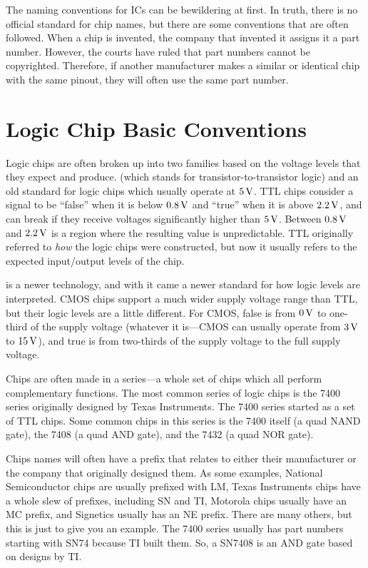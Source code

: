 The naming conventions for ICs can be bewildering at first.
In truth, there is no official standard for chip names, but there are some conventions that are often followed.
When a chip is invented, the company that invented it assigns it a part number.
However, the courts have ruled that part numbers cannot be copyrighted.
Therefore, if another manufacturer makes a similar or identical chip with the same pinout, they will often use the same part number.

\section{Logic Chip Basic Conventions}

Logic chips are often broken up into two families based on the voltage levels that they expect and produce.
 (which stands for transistor-to-transistor logic) and an old standard for logic chips which usually operate at $5\,\si{\volt}$.
TTL chips consider a signal to be ``false'' when it is below $0.8\,\si{\volt}$ and ``true'' when it is above $2.2\,\si{\volt}$, and can break if they receive voltages significantly higher than $5\,\si{\volt}$.
Between $0.8\,\si{\volt}$ and $2.2\,\si{\volt}$ is a region where the resulting value is unpredictable.
TTL originally referred to \emph{how} the logic chips were constructed, but now it usually refers to the expected input/output levels of the chip.

 is a newer technology, and with it came a newer standard for how logic levels are interpreted.  
CMOS chips support a much wider supply voltage range than TTL, but their logic levels are a little different.
For CMOS, false is from $0\,\si{\volt}$ to one-third of the supply voltage (whatever it is---CMOS can usually operate from $3\,\si{\volt}$ to $15\,\si{\volt}$), and true is from two-thirds of the supply voltage to the full supply voltage.

Chips are often made in a series---a whole set of chips which all perform complementary functions.
The most common series of logic chips is the 7400 series originally designed by Texas Instruments.
The 7400 series started as a set of TTL chips.
Some common chips in this series is the 7400 itself (a quad NAND gate), the 7408 (a quad AND gate), and the 7432 (a quad NOR gate).

Chips names will often have a prefix that relates to either their manufacturer or the company that originally designed them.
As some examples, National Semiconductor chips are usually prefixed with LM, Texas Instruments chips have a whole slew of prefixes, including SN and TI, Motorola chips usually have an MC prefix, and Signetics usually has an NE prefix.
There are many others, but this is just to give you an example.
The 7400 series usually has part numbers starting with SN74 because TI built them.
So, a SN7408 is an AND gate based on designs by TI.

